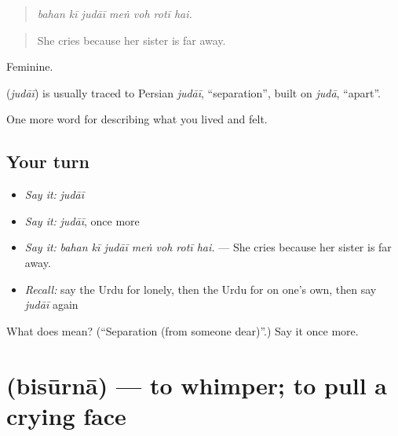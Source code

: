 \begin{quote}
      
\end{quote}

\begin{quote}
\emph{bahan kī judāī meṅ voh rotī hai.}
\end{quote}

\begin{quote}
She cries because her sister is far away.
\end{quote}

Feminine.

\begin{cousinweb}
\textbf{} (\emph{judāī}) is usually traced to Persian \emph{judāī}, \textquotedblleft{}separation\textquotedblright{}, built on \emph{judā}, \textquotedblleft{}apart\textquotedblright{}.
\end{cousinweb}

\begin{grammarlens}[title={What you've built}]
One more word for describing what you lived and felt.
\end{grammarlens}

\subsection*{Your turn}
\begin{itemize}
\raggedright
  \item \emph{Say it:} \emph{judāī}
  \item \emph{Say it:} \emph{judāī}, once more
  \item \emph{Say it:} \emph{bahan kī judāī meṅ voh rotī hai.} — She cries because her sister is far away.
  \item \emph{Recall:} say the Urdu for lonely, then the Urdu for on one's own, then say \emph{judāī} again
\end{itemize}

\begin{tcolorbox}[breakable,colback=teal!4,colframe=teal!35!black,title={Before you move on}]
What does  mean? (\textquotedblleft{}Separation (from someone dear)\textquotedblright{}.) Say it once more.
\end{tcolorbox}
\section[\texorpdfstring{\ur{بسورنا} (bisūrnā)}{بسورنا (bisūrnā)}]{ (bisūrnā) — to whimper; to pull a crying face}

